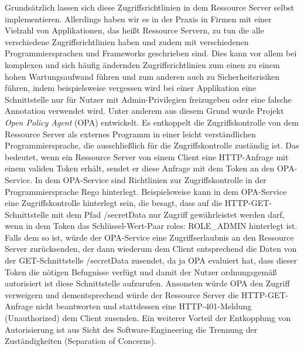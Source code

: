 Grundsätzlich lassen sich diese Zugriffsrichtlinien in dem Ressource Server selbst implementieren. Allerdings haben wir es in der Praxis in Firmen mit einer Vielzahl von Applikationen, das heißt Ressource Servern, zu tun die alle verschiedene Zugriffsrichtlinien haben und zudem mit verschiedenen Programmiersprachen und Frameworks geschrieben sind. Dies kann vor allem bei komplexen und sich häufig ändernden Zugriffsrichtlinien zum einen zu einem hohen Wartungsaufwand führen und zum anderen auch zu Sicherheitsrisiken führen, indem beispielsweise vergessen wird bei einer Applikation eine Schnittstelle nur für Nutzer mit Admin-Privilegien freizugeben oder eine falsche Annotation verwendet wird. 
Unter anderem aus diesem Grund wurde Projekt \emph{Open Policy Agent} (OPA) entwickelt. Es entkoppelt die Zugriffskontrolle von dem Ressource Server als externes Programm in einer leicht verständlichen Programmiersprache, die ausschließlich für die Zugriffskontrolle zuständig ist. Das bedeutet, wenn ein Ressource Server von einem Client eine HTTP-Anfrage mit einem validen Token erhält, sendet er diese Anfrage mit dem Token an den OPA-Service. In dem OPA-Service sind Richtlinien zur Zugriffskontrolle in der Programmiersprache Rego hinterlegt. Beispielsweise kann in dem OPA-Service eine Zugriffskontrolle hinterlegt sein, die besagt, dass auf die HTTP-GET-Schnittstelle mit dem Pfad /secretData nur Zugriff gewährleistet werden darf, wenn in dem Token das Schlüssel-Wert-Paar roles: ROLE\_ADMIN hinterlegt ist. Falls dem so ist, würde der OPA-Service eine Zugriffserlaubnis an den Ressource Server zurücksenden, der dann wiederum dem Client entsprechend die Daten von der GET-Schnittstelle /secretData zusendet, da ja OPA evaluiert hat, dass dieser Token die nötigen Befugnisse verfügt und damit der Nutzer ordnungsgemäß autorisiert ist diese Schnittstelle aufzurufen. Ansonsten würde \ac{OPA} den Zugriff verweigern und dementsprechend würde der Ressource Server die HTTP-GET-Anfrage nicht beantworten und stattdessen eine HTTP-401-Meldung (Unauthorized) dem Client zusenden. Ein weiterer Vorteil der Entkopplung von Autorisierung ist aus Sicht des Software-Engineering die Trennung der Zuständigkeiten (Separation of Concerns). 

%
%
